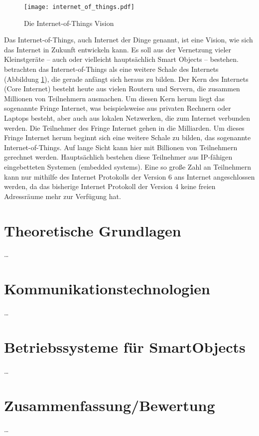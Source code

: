 \begin{figure}[htbp]
	\centering
	\texttt{[image: internet\_of\_things.pdf]}
	\caption{Die Internet-of-Things Vision \cite[Figure 1.2]{Bormann:6LoWPAN}}
	\label{fig:internet_of_things}
\end{figure}

Das Internet-of-Things, auch Internet der Dinge genannt, ist eine Vision, wie sich das Internet in Zukunft entwickeln kann. Es soll aus der Vernetzung vieler Kleinstgeräte -- auch oder vielleicht hauptsächlich Smart Objects -- bestehen. \textcite{Bormann:6LoWPAN} betrachten das Internet-of-Things als eine weitere Schale des Internets (Abbildung \ref{fig:internet_of_things}), die gerade anfängt sich heraus zu bilden. Der Kern des Internets (Core Internet) besteht heute aus vielen Routern und Servern, die zusammen Millionen von Teilnehmern ausmachen. Um diesen Kern herum liegt das sogenannte Fringe Internet, was beispielsweise aus privaten Rechnern oder Laptops besteht, aber auch aus lokalen Netzwerken, die zum Internet verbunden werden. Die Teilnehmer des Fringe Internet gehen in die Milliarden. Um dieses Fringe Internet herum beginnt sich eine weitere Schale zu bilden, das sogenannte Internet-of-Things. Auf lange Sicht kann hier mit Billionen von Teilnehmern gerechnet werden. Hauptsächlich bestehen diese Teilnehmer aus IP-fähigen eingebetteten Systemen (embedded systems). Eine so große Zahl an Teilnehmern kann nur mithilfe des Internet Protokolls der Version 6 ans Internet angeschlossen werden, da das bisherige Internet Protokoll der Version 4 keine freien Adressräume mehr zur Verfügung hat.

\section{Theoretische Grundlagen}
\ldots
\section{Kommunikationstechnologien}
\ldots
\section{Betriebssysteme für SmartObjects}
\ldots
\section{Zusammenfassung/Bewertung}
\ldots